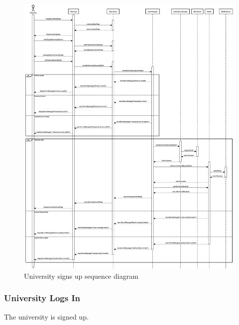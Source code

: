 \begin{figure}[h!]
    \centering
    \includegraphics[width=14cm]{images/sequence-diagrams/university-signs-up.png}
    \caption{University signs up sequence diagram}
\end{figure}

\newpage
\subsubsection{University Logs In}
The university is signed up. 

